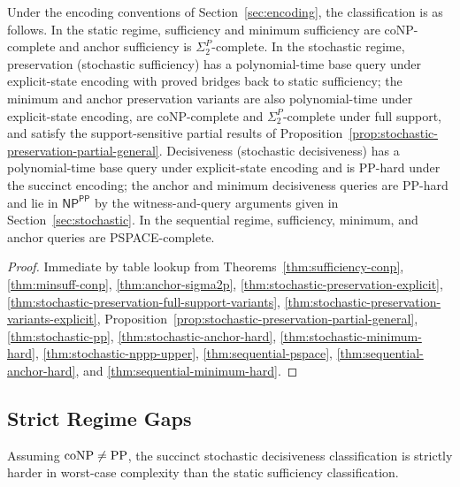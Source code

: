 \begin{theorem}\label{thm:regime-main}
Under the encoding conventions of Section~\ref{sec:encoding}, the classification is as follows. In the static regime, sufficiency and minimum sufficiency are coNP-complete and anchor sufficiency is $\Sigma_2^P$-complete. In the stochastic regime, preservation (stochastic sufficiency) has a polynomial-time base query under explicit-state encoding with proved bridges back to static sufficiency; the minimum and anchor preservation variants are also polynomial-time under explicit-state encoding, are coNP-complete and $\Sigma_2^P$-complete under full support, and satisfy the support-sensitive partial results of Proposition~\ref{prop:stochastic-preservation-partial-general}. Decisiveness (stochastic decisiveness) has a polynomial-time base query under explicit-state encoding and is PP-hard under the succinct encoding; the anchor and minimum decisiveness queries are PP-hard and lie in $\textsf{NP}^{\textsf{PP}}$ by the witness-and-query arguments given in Section~\ref{sec:stochastic}. In the sequential regime, sufficiency, minimum, and anchor queries are PSPACE-complete.
\end{theorem}


\begin{proof}
Immediate by table lookup from Theorems~\ref{thm:sufficiency-conp}, \ref{thm:minsuff-conp}, \ref{thm:anchor-sigma2p}, \ref{thm:stochastic-preservation-explicit}, \ref{thm:stochastic-preservation-full-support-variants}, \ref{thm:stochastic-preservation-variants-explicit}, Proposition~\ref{prop:stochastic-preservation-partial-general}, \ref{thm:stochastic-pp}, \ref{thm:stochastic-anchor-hard}, \ref{thm:stochastic-minimum-hard}, \ref{thm:stochastic-nppp-upper}, \ref{thm:sequential-pspace}, \ref{thm:sequential-anchor-hard}, and \ref{thm:sequential-minimum-hard}.
\end{proof}

\subsection{Strict Regime Gaps}

\begin{theorem}\label{thm:static-stochastic-strict}
Assuming $\mathrm{coNP} \ne \mathrm{PP}$, the succinct stochastic decisiveness classification is strictly harder in worst-case complexity than the static sufficiency classification.
\end{theorem}



